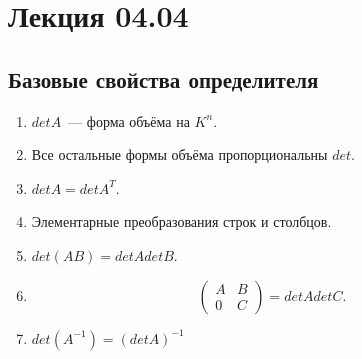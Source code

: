 \section{Лекция 04.04}
\subsection{Базовые свойства определителя}
\begin{theorem}\leavevmode
    \begin{enumerate}
        \item $det A$~--- форма объёма на $K^n$.
        \item Все остальные формы объёма пропорциональны $det$.
        \item $det A = det A^T$.
        \item Элементарные преобразования строк и столбцов.
        \item  $det(AB) = detAdetB$.
        \item  \[
        \left(\begin{array}{c|c}
                A & B\\
                \hline
                0 & C
        \end{array}\right) = det A det C
        .\] 
    \item $det(A^{-1}) = (det A)^{-1}$
    \end{enumerate}
\end{theorem}

